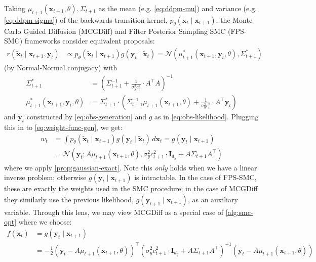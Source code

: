 Taking $\mu_{t+1}(\mathbf{x}_{t+1}, \theta), \Sigma_{t+1}$ as the mean (e.g. \ref{eq:ddpm-mu}) and
variance (e.g. \ref{eq:ddpm-sigma}) of the backwards transition kernel,
$p_\theta(\mathbf{x}_t \mid \mathbf{x}_{t+1})$, the Monte Carlo Guided Diffusion (MCGDiff)
\parencite{cardosoMonteCarloGuided2023} and Filter Posterior Sampling SMC (FPS-SMC)
\parencite{douDiffusionPosteriorSampling2023} frameworks consider equivalent proposals:
\begin{align*}
    r(\tilde{\mathbf{x}}_{t} \mid \mathbf{x}_{t+1}, \mathbf{y}_t) &\propto p_\theta(\tilde{\mathbf{x}}_t \mid \mathbf{x}_{t+1})g(\mathbf{y}_{t} \mid \tilde{\mathbf{x}}_{t})
    = \mathcal{N}(\mu^{*}_{t+1}(\mathbf{x}_{t+1}, \mathbf{y}_t, \theta), \Sigma_{t+1}^{*})
\end{align*}
(by Normal-Normal conjugacy) with
\begin{align*}
    \Sigma_{t+1}^{*} &= \left(\Sigma_{t+1}^{-1} + \frac{1}{\sigma_y^2c_t^2}\cdot A^\top A \right)^{-1} \\
    \mu_{t+1}^{*}(\mathbf{x}_{t+1}, \mathbf{y}_t, \theta) &= \Sigma_{t+1}^{*}\cdot\left(\Sigma_{t+1}^{-1}\mu_{t+1}(\mathbf{x}_{t+1}, \theta) + \frac{1}{\sigma_y^2c_t^2}\cdot A^\top\mathbf{y}_t \right)
\end{align*}
and $\mathbf{y}_t$ constructed by \ref{eq:obs-generation} and $g$ as in \ref{eq:obs-likelihood}.
Plugging this in to \ref{eq:weight-func-gen}, we get:
\begin{align*}
    w_t &= \int p_\theta(\tilde{\mathbf{x}}_t \mid \mathbf{x}_{t+1})g(\mathbf{y}_{t} \mid \tilde{\mathbf{x}}_{t})\, d\mathbf{x}_t
    = g(\mathbf{y}_t \mid \mathbf{x}_{t+1}) \\
    &= \mathcal{N}\left(\mathbf{y}_t; A\mu_{t+1}(\mathbf{x}_{t+1}, \theta), \sigma_y^2c_{t+1}^2\cdot\mathbf{I}_{d_y} + A\Sigma_{t+1}A^\top\right)
\end{align*}
where we apply \ref{prop:gaussian-exact}. Note this \emph{only} holds when we have a linear inverse
problem; otherwise $g(\mathbf{y}_t \mid \mathbf{x}_{t+1})$ is intractable. In the case of FPS-SMC,
these are exactly the weights used in the SMC procedure; in the case of MCGDiff they similarly
use the previous likelihood, $g(\mathbf{y}_{t+1} \mid \mathbf{x}_{t+1})$, as an auxiliary variable.
Through this lens, we may view MCGDiff as a special case of \ref{alg:smc-opt} where we choose:
\begin{align*}
    f(\tilde{\mathbf{x}}_t) &= g(\mathbf{y}_t \mid \mathbf{x}_{t+1}) \\
    &= -\frac{1}{2}(\mathbf{y}_t - A\mu_{t+1}(\mathbf{x}_{t+1}, \theta))^\top\left(\sigma_y^2c_{t+1}^2\cdot\mathbf{I}_{d_y} + A\Sigma_{t+1}A^\top\right)^{-1}(\mathbf{y}_t - A\mu_{t+1}(\mathbf{x}_{t+1}, \theta))
\end{align*}
